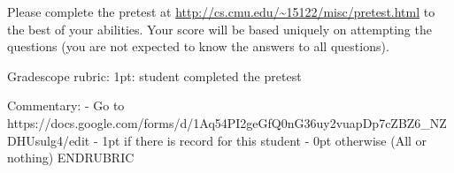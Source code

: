 
Please complete the pretest at
\url{http://cs.cmu.edu/~15122/misc/pretest.html} to the best of your
abilities.  Your score will be based uniquely on attempting the
questions (you are not expected to know the answers to all questions).

\RUBRIC

Gradescope rubric:
1pt: student completed the pretest

Commentary:
- Go to https://docs.google.com/forms/d/1Aq54PI2geGfQ0nG36uy2vuapDp7cZBZ6_NZDHUsulg4/edit
- 1pt if there is record for this student
- 0pt otherwise
(All or nothing)
ENDRUBRIC

\bigskip